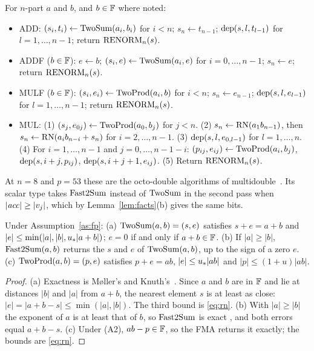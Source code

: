  For $n$-part $a$ and $b$, and $b \in \mathbb{F}$ where noted:
\begin{itemize}
\item ADD: $(s_i, t_i) \gets \mathrm{TwoSum}(a_i, b_i)$ for $i < n$; $s_n \gets t_{n-1}$; $\mathrm{dep}(s, l, t_{l-1})$ for $l = 1,
\dots, n-1$; return $\mathrm{RENORM}_n(s)$.
\item ADDF ($b \in \mathbb{F}$): $e \gets b$; $(s_i, e) \gets \mathrm{TwoSum}(a_i, e)$ for $i = 0, \dots, n-1$; $s_n \gets e$; return
$\mathrm{RENORM}_n(s)$.
\item MULF ($b \in \mathbb{F}$): $(s_i, e_i) \gets \mathrm{TwoProd}(a_i, b)$ for $i < n$; $s_n \gets e_{n-1}$; $\mathrm{dep}(s, l, e_{l-1})$ for
$l = 1, \dots, n-1$; return $\mathrm{RENORM}_n(s)$.
\item MUL: (1) $(s_j, e_{0j}) \gets \mathrm{TwoProd}(a_0, b_j)$ for $j < n$. (2) $s_n \gets \mathrm{RN}(a_1 b_{n-1})$, then $s_n \gets
\mathrm{RN}(a_i b_{n-i} + s_n)$ for $i = 2, \dots, n-1$. (3) $\mathrm{dep}(s, l, e_{0,l-1})$ for $l = 1, \dots, n$. (4) For
$i = 1, \dots, n-1$ and $j = 0, \dots, n-1-i$: $(p_{ij}, e_{ij}) \gets \mathrm{TwoProd}(a_i, b_j)$, $\mathrm{dep}(s, i+j, p_{ij})$,
$\mathrm{dep}(s, i+j+1, e_{ij})$. (5) Return $\mathrm{RENORM}_n(s)$.
\end{itemize}
At $n = 8$ and $p = 53$ these are the octo-double algorithms of multidouble~\cite{md}. Its scalar type takes $\mathrm{Fast2Sum}$
instead of $\mathrm{TwoSum}$ in the second pass when $|\mathit{acc}| \ge |v_j|$, which by Lemma~\ref{lem:facts}(b) gives the same bits.

\begin{lemma}[standard]\label{lem:facts}
Under Assumption~\ref{as:fp}: (a) $\mathrm{TwoSum}(a, b) = (s, e)$ satisfies $s + e = a + b$ and $|e| \le \min(|a|, |b|, u_{*}|a+b|)$;
$e = 0$ if and only if $a + b \in \mathbb{F}$. (b) If $|a| \ge |b|$, $\mathrm{Fast2Sum}(a, b)$ returns the $s$ and $e$ of
$\mathrm{TwoSum}(a,b)$, up to the sign of a zero $e$. (c) $\mathrm{TwoProd}(a, b) = (p, e)$ satisfies $p + e = ab$, $|e| \le u_{*}|ab|$
and $|p| \le (1+u)|ab|$.
\end{lemma}

\begin{proof}
(a) Exactness is M{\o}ller's and Knuth's~\cite{Moller65,Knuth97}. Since $a$ and $b$ are in $\mathbb{F}$ and lie at distances $|b|$ and $|a|$ from $a+b$, the nearest
element $s$ is at least as close: $|e| = |a + b - s| \le \min(|a|, |b|)$. The third bound is \eqref{eq:rn}. (b) With
$|a| \ge |b|$ the exponent of $a$ is at least that of $b$, so $\mathrm{Fast2Sum}$ is exact \cite{Dekker71}, and both errors
equal $a + b - s$. (c) Under (A2), $ab - p \in \mathbb{F}$, so the FMA returns it exactly; the bounds are \eqref{eq:rn}.
\end{proof}

